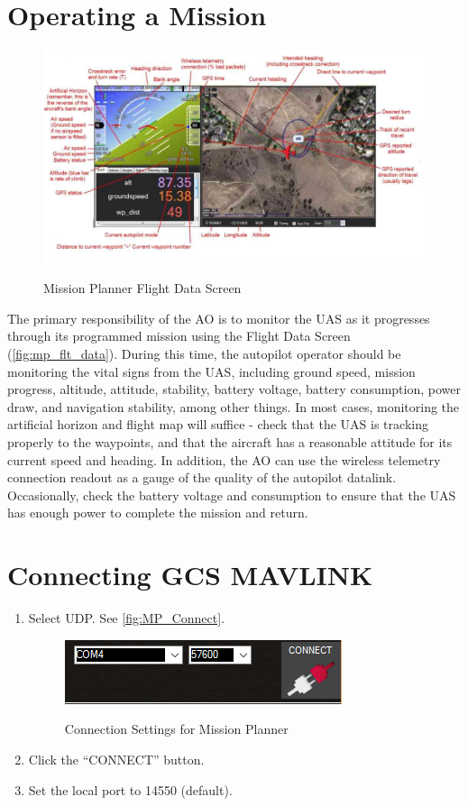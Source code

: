\documentclass{report}
\begin{document}
	\section{Operating a Mission}
		\begin{figure}[ht]
			\centering
			\caption{Mission Planner Flight Data Screen}
			\includegraphics[width=\textwidth]{mp_hud_full.jpg}
			\label{fig:mp_flt_data}
		\end{figure}
		The primary responsibility of the \gls{AO} is to monitor the \gls{UAS} as it progresses through its programmed mission using the Flight Data Screen (\autoref{fig:mp_flt_data}).  During this time, the autopilot operator should be monitoring the vital signs from the \gls{UAS}, including ground speed, mission progress, altitude, attitude, stability, battery voltage, battery consumption, power draw, and navigation stability, among other things.  In most cases, monitoring the artificial horizon and flight map will suffice - check that the \gls{UAS} is tracking properly to the waypoints, and that the aircraft has a reasonable attitude for its current speed and heading.  In addition, the \gls{AO} can use the wireless telemetry connection readout as a gauge of the quality of the autopilot datalink.  Occasionally, check the battery voltage and consumption to ensure that the \gls{UAS} has enough power to complete the mission and return.
	\section{Connecting GCS MAVLINK}
		\begin{enumerate}
			\item Select UDP.  See \autoref{fig:MP_Connect}.
				\begin{figure}[ht]
					\centering
					\caption{Connection Settings for Mission Planner}
					\includegraphics{MisionPlanner_ConnectButton.png}
					\label{fig:MP_Connect}
				\end{figure}
			\item Click the ``CONNECT'' button.
			\item Set the local port to 14550 (default).
		\end{enumerate}
\appendix
\end{document}
